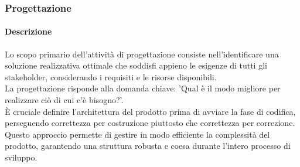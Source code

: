 \subsubsection{Progettazione}

\paragraph{Descrizione}
Lo scopo primario dell'attività di progettazione consiste nell'identificare una soluzione realizzativa ottimale che soddisfi appieno le esigenze di tutti gli stakeholder, considerando i requisiti e le risorse disponibili. \\
La progettazione risponde alla domanda chiave: 'Qual è il modo migliore per realizzare ciò di cui c'è bisogno?'. \\
È cruciale definire l'architettura del prodotto prima di avviare la fase di codifica, perseguendo correttezza per costruzione piuttosto che correttezza per correzione. Questo approccio permette di gestire in modo efficiente la complessità del prodotto, garantendo una struttura robusta e coesa durante l'intero processo di sviluppo. \\

